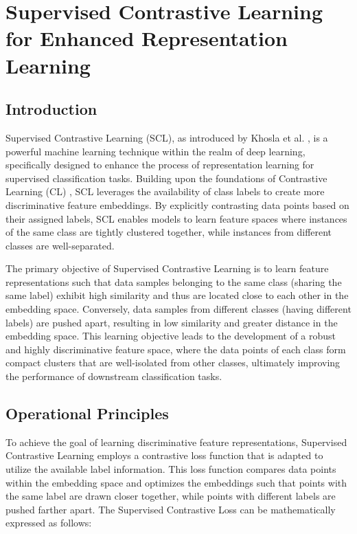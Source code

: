 \section{Supervised Contrastive Learning for Enhanced Representation Learning}

\subsection{Introduction}

Supervised Contrastive Learning (SCL), as introduced by Khosla et al. \cite{khosla2020supervised}, is a powerful machine learning technique within the realm of deep learning, specifically designed to enhance the process of representation learning for supervised classification tasks. Building upon the foundations of Contrastive Learning (CL) \cite{hadsell2006dimensionality, chen2020simple}, SCL leverages the availability of class labels to create more discriminative feature embeddings. By explicitly contrasting data points based on their assigned labels, SCL enables models to learn feature spaces where instances of the same class are tightly clustered together, while instances from different classes are well-separated.

The primary objective of Supervised Contrastive Learning is to learn feature representations such that data samples belonging to the same class (sharing the same label) exhibit high similarity and thus are located close to each other in the embedding space. Conversely, data samples from different classes (having different labels) are pushed apart, resulting in low similarity and greater distance in the embedding space. This learning objective leads to the development of a robust and highly discriminative feature space, where the data points of each class form compact clusters that are well-isolated from other classes, ultimately improving the performance of downstream classification tasks.

\subsection{Operational Principles}

To achieve the goal of learning discriminative feature representations, Supervised Contrastive Learning employs a contrastive loss function that is adapted to utilize the available label information. This loss function compares data points within the embedding space and optimizes the embeddings such that points with the same label are drawn closer together, while points with different labels are pushed farther apart. The Supervised Contrastive Loss can be mathematically expressed as follows:

